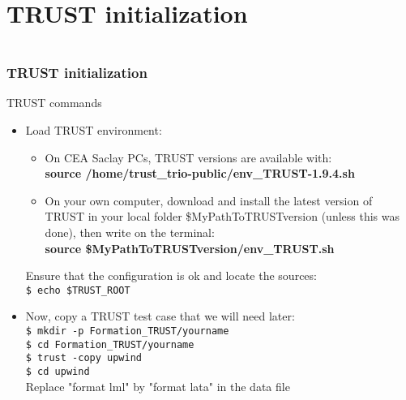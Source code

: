 \documentclass[10pt, hyperref={unicode=true,pdfusetitle, bookmarks=true,bookmarksnumbered=false,bookmarksopen=false, breaklinks=false,pdfborder={0 0 1},backref=true,colorlinks=true,linkcolor=darkblue,pageanchor, urlcolor=darkblue}]{beamer}
\begin{document}
\section{{\bf{TRUST initialization }}}
\begin{frame}
\begin{columns}[c] 
\tableofcontents[sections={1-4},currentsection, currentsubsection]
\tableofcontents[sections={5-10},currentsection, currentsubsection]
\end{columns}
\end{frame}
\begin{frame}
\frametitle{TRUST initialization}\label{initTrust}
\begin{block}{TRUST commands}

\begin{itemize}
\item Load TRUST environment:
\begin{itemize}
\item On CEA Saclay PCs, TRUST versions are available with:\\
\textbf{source  /home/trust\_trio-public/env\_TRUST-1.9.4.sh}
%
\item On your own computer, download and install the latest version of TRUST in your local folder \$MyPathToTRUSTversion (unless this was done), then write on the terminal:\\
%
\textbf{source  \$MyPathToTRUSTversion/env\_TRUST.sh}
%
\end{itemize}
%

Ensure that the configuration is ok and locate the sources:\\
\texttt{\$ echo \$TRUST\_ROOT}

\item Now, copy a TRUST test case that we will need later:\\
\texttt{\$ mkdir -p Formation\_TRUST/yourname}\\
\texttt{\$ cd Formation\_TRUST/yourname}\\
\texttt{\$ trust -copy upwind}\\
\texttt{\$ cd upwind}\\
Replace "format lml" by "format lata" in the data file\\
\end{itemize}

\end{block}
\end{frame}
\end{document}
